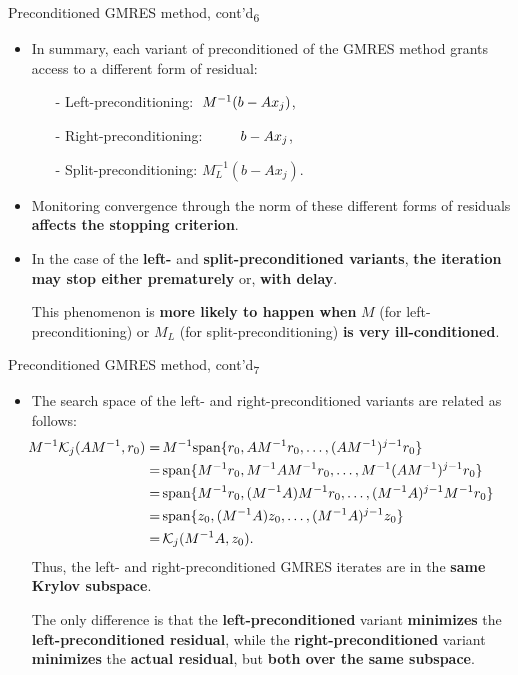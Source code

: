 \documentclass[t,usepdftitle=false]{beamer}
\begin{document}
\begin{frame}{Preconditioned GMRES method, cont'd\textsubscript{6}}
\begin{itemize}
\item In summary, each variant of preconditioned of the GMRES method grants access to a different form of residual:
\begin{itemize}\normalsize
\item[-] Left-preconditioning: $\hspace{.1cm}M^{-1}(b-Ax_j)$,\vspace{.1cm}
\item[-] Right-preconditioning: $\hspace{.83cm}b-Ax_j$,\vspace{.1cm}
\item[-] Split-preconditioning: $M_L^{-1}(b-Ax_j)$.
\end{itemize}
\item Monitoring convergence through the norm of these different forms of residuals \textbf{affects the stopping criterion}.
\item In the case of the \textbf{left-} and \textbf{split-preconditioned variants}, \textbf{the iteration may stop either prematurely} or, \textbf{with delay}.
\item[]This phenomenon is \textbf{more likely to happen when} $M$ (for left-preconditioning) or $M_L$ (for split-preconditioning) \textbf{is very ill-conditioned}.
\end{itemize}
\end{frame}

\begin{frame}{Preconditioned GMRES method, cont'd\textsubscript{7}}
\begin{itemize}
\item The search space of the left- and right-preconditioned variants are related as follows:
\begin{align*}
\hspace{-.525cm}
M^{-1}\mathcal{K}_j(AM^{-1},r_0)
=&\,M^{-1}\text{span}\{r_0,AM^{-1}r_0,\dots,(AM^{-1})^{j-1}r_0\}\\
=&\,\text{span}\{M^{-1}r_0,M^{-1}AM^{-1}r_0,\dots,M^{-1}(AM^{-1})^{j-1}r_0\}\\
=&\,\text{span}\{M^{-1}r_0,(M^{-1}A)M^{-1}r_0,\dots,(M^{-1}A)^{j-1}M^{-1}r_0\}\\
=&\,\text{span}\{z_0,(M^{-1}A)z_0,\dots,(M^{-1}A)^{j-1}z_0\}\\
=&\,\mathcal{K}_j(M^{-1}A,z_0).
\end{align*}
Thus, the left- and right-preconditioned GMRES iterates are in the \textbf{same Krylov subspace}.
\item[] The only difference is that the \textbf{left-preconditioned} variant \textbf{minimizes} the \textbf{left-preconditioned residual}, while the \textbf{right-preconditioned} variant \textbf{minimizes} the \textbf{actual residual}, but \textbf{both over the same subspace}.
\end{itemize}
\end{frame}
\end{document}

